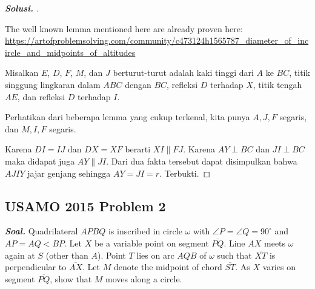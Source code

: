 \documentclass[letterpaper, 13pt]{scrartcl}
\begin{document}
\begin{proof}[\textbf{Solusi. }]
\begin{center}
\end{center}

    The well known lemma mentioned here are already proven here: \url{https://artofproblemsolving.com/community/c473124h1565787_diameter_of_incircle_and_midpoints_of_altitudes}

    Misalkan $E$, $D$, $F$, $M$, dan $J$ berturut-turut adalah kaki tinggi dari $A$ ke $BC$, titik singgung lingkaran dalam $ABC$ dengan $BC$, refleksi $D$ terhadap $X$, titik tengah $AE$, dan refleksi $D$ terhadap $I$.

    Perhatikan dari beberapa lemma yang cukup terkenal, kita punya $A,J,F$ segaris, dan $M,I,F$ segaris.

    Karena $DI = IJ$ dan $DX = XF$ berarti $XI \parallel FJ$. Karena $AY \perp BC$ dan $JI \perp BC$ maka didapat juga $AY \parallel JI$. Dari dua fakta tersebut dapat disimpulkan bahwa $AJIY$ jajar genjang sehingga $AY = JI = r$. Terbukti.
\end{proof}

\subsection{USAMO 2015 Problem 2}

\textbf{\textit{Soal. }}Quadrilateral $APBQ$ is inscribed in circle $\omega$ with $\angle P = \angle Q = 90^{\circ}$ and $AP = AQ < BP$. Let $X$ be a variable point on segment $\overline{PQ}$. Line $AX$ meets $\omega$ again at $S$ (other than $A$). Point $T$ lies on arc $AQB$ of $\omega$ such that $\overline{XT}$ is perpendicular to $\overline{AX}$. Let $M$ denote the midpoint of chord $\overline{ST}$. As $X$ varies on segment $\overline{PQ}$, show that $M$ moves along a circle.
\end{document}
